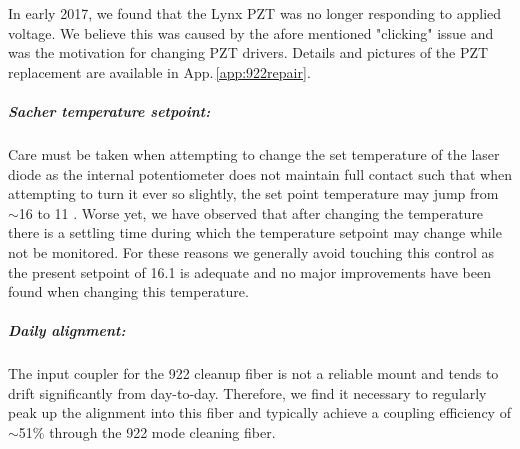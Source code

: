 In early 2017, we found that the Lynx PZT was no longer responding to applied voltage.
We believe this was caused by the afore mentioned "clicking" issue and was the motivation for changing PZT drivers.
Details and pictures of the PZT replacement are available in App.\,\ref{app:922repair}.

\subparagraph{Sacher temperature setpoint:}
Care must be taken when attempting to change the set temperature of the laser diode as the internal potentiometer does not maintain full contact such that when attempting to turn it ever so slightly, the set point temperature may jump from $\sim$16 \degreeC to 11 \degreeC.
Worse yet, we have observed that after changing the temperature there is a settling time during which the temperature setpoint may change while not be monitored.
For these reasons we generally avoid touching this control as the present setpoint of 16.1 \degreeC is adequate and no major improvements have been found when changing this temperature.

\subparagraph{Daily alignment:}
The input coupler for the 922 cleanup fiber is not a reliable mount and tends to drift significantly from day-to-day.
Therefore, we find it necessary to regularly peak up the alignment into this fiber and typically achieve a coupling efficiency of $\sim$51\% through the 922 mode cleaning fiber.

		

